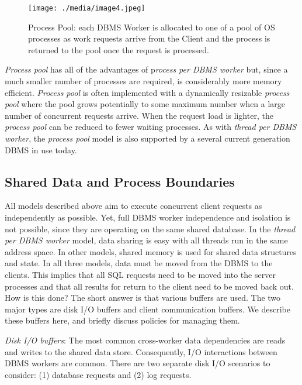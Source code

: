 \documentclass[a4paper,11pt,twoside,openright]{book}
\begin{document}
\begin{figure}
\texttt{[image: ./media/image4.jpeg]}

\caption{Process Pool: each DBMS Worker is allocated to one of a pool of
OS processes as work requests arrive from the Client and the process is
returned to the pool once the request is processed.\label{fig-2-3}}
\end{figure}

\emph{Process pool} has all of the advantages of p\emph{rocess per DBMS
worker} but, since a much smaller number of processes are required, is
considerably more memory efficient. \emph{Process pool} is often
implemented with a dynamically resizable \emph{process pool} where the
pool grows potentially to some maximum number when a large number of
concurrent requests arrive. When the request load is lighter, the
\emph{process pool} can be reduced to fewer waiting processes. As with
\emph{thread per DBMS worker}, the \emph{process pool} model is also
supported by a several current generation DBMS in use today.

\hypertarget{shared-data-and-process-boundaries}{%
\subsection{Shared Data and Process
Boundaries}\label{shared-data-and-process-boundaries}}

All models described above aim to execute concurrent client requests as
independently as possible. Yet, full DBMS worker independence and
isolation is not possible, since they are operating on the same shared
database. In the \emph{thread per DBMS worker} model, data sharing is
easy with all threads run in the same address space. In other models,
shared memory is used for shared data structures and state. In all three
models, data must be moved from the DBMS to the clients. This implies
that all SQL requests need to be moved into the server processes and
that all results for return to the client need to be moved back out. How
is this done? The short answer is that various buffers are used. The two
major types are disk I/O buffers and client communication buffers. We
describe these buffers here, and briefly discuss policies for managing
them.

\emph{Disk I/O buffers}: The most common cross-worker data dependencies
are reads and writes to the shared data store. Consequently, I/O
interactions between DBMS workers are common. There are two separate
disk I/O scenarios to consider: (1) database requests and (2) log
requests.
\end{document}
